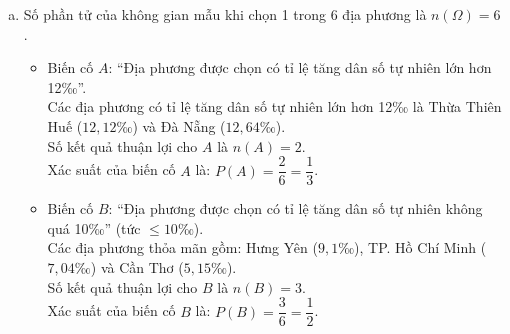 \begin{bt}
{\begin{enumerate}[a)]
\begin{itemize}
        \item TP. Hồ Chí Minh: $13{,}6 - 6{,}56 = 7{,}04$‰.
        \item Cần Thơ: $13{,}5 - 8{,}35 = 5{,}15$‰.
    \end{itemize}
    So sánh các tỉ lệ trên, ta thấy $12{,}64$‰ là lớn nhất.\\
    Vậy Đà Nẵng là địa phương có tỉ lệ tăng dân số tự nhiên lớn nhất năm 2022 trong các địa phương đã cho.
    \item Số phần tử của không gian mẫu khi chọn 1 trong 6 địa phương là $n(\Omega) = 6$.
    \begin{itemize}
        \item Biến cố $A$: “Địa phương được chọn có tỉ lệ tăng dân số tự nhiên lớn hơn 12‰”.\\
        Các địa phương có tỉ lệ tăng dân số tự nhiên lớn hơn 12‰ là Thừa Thiên Huế ($12{,}12$‰) và Đà Nẵng ($12{,}64$‰).\\
        Số kết quả thuận lợi cho $A$ là $n(A) = 2$.\\
        Xác suất của biến cố $A$ là:
        $P(A) = \dfrac{2}{6} = \dfrac{1}{3}$.
        \item Biến cố $B$: “Địa phương được chọn có tỉ lệ tăng dân số tự nhiên không quá 10‰” (tức $\le 10$‰).\\
        Các địa phương thỏa mãn gồm: Hưng Yên ($9{,}1$‰), TP. Hồ Chí Minh ($7{,}04$‰) và Cần Thơ ($5{,}15$‰).\\
        Số kết quả thuận lợi cho $B$ là $n(B) = 3$.\\
        Xác suất của biến cố $B$ là:
        $P(B) = \dfrac{3}{6} = \dfrac{1}{2}$.
    \end{itemize}
\end{enumerate}
}
\end{bt}

